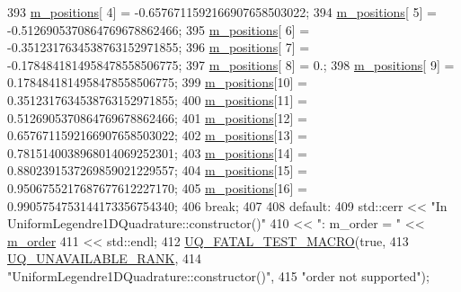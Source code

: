 \begin{DoxyCode}
393       \hyperlink{class_q_u_e_s_o_1_1_base1_d_quadrature_aeda387c028c3ba89ea0f9637a2234212}{m\_positions}[ 4] = -0.6576711592166907658503022;
394       \hyperlink{class_q_u_e_s_o_1_1_base1_d_quadrature_aeda387c028c3ba89ea0f9637a2234212}{m\_positions}[ 5] = -0.5126905370864769678862466;
395       \hyperlink{class_q_u_e_s_o_1_1_base1_d_quadrature_aeda387c028c3ba89ea0f9637a2234212}{m\_positions}[ 6] = -0.3512317634538763152971855;
396       \hyperlink{class_q_u_e_s_o_1_1_base1_d_quadrature_aeda387c028c3ba89ea0f9637a2234212}{m\_positions}[ 7] = -0.1784841814958478558506775;
397       \hyperlink{class_q_u_e_s_o_1_1_base1_d_quadrature_aeda387c028c3ba89ea0f9637a2234212}{m\_positions}[ 8] =  0.;
398       \hyperlink{class_q_u_e_s_o_1_1_base1_d_quadrature_aeda387c028c3ba89ea0f9637a2234212}{m\_positions}[ 9] =  0.1784841814958478558506775;
399       \hyperlink{class_q_u_e_s_o_1_1_base1_d_quadrature_aeda387c028c3ba89ea0f9637a2234212}{m\_positions}[10] =  0.3512317634538763152971855;
400       \hyperlink{class_q_u_e_s_o_1_1_base1_d_quadrature_aeda387c028c3ba89ea0f9637a2234212}{m\_positions}[11] =  0.5126905370864769678862466;
401       \hyperlink{class_q_u_e_s_o_1_1_base1_d_quadrature_aeda387c028c3ba89ea0f9637a2234212}{m\_positions}[12] =  0.6576711592166907658503022;
402       \hyperlink{class_q_u_e_s_o_1_1_base1_d_quadrature_aeda387c028c3ba89ea0f9637a2234212}{m\_positions}[13] =  0.7815140038968014069252301;
403       \hyperlink{class_q_u_e_s_o_1_1_base1_d_quadrature_aeda387c028c3ba89ea0f9637a2234212}{m\_positions}[14] =  0.8802391537269859021229557;
404       \hyperlink{class_q_u_e_s_o_1_1_base1_d_quadrature_aeda387c028c3ba89ea0f9637a2234212}{m\_positions}[15] =  0.9506755217687677612227170;
405       \hyperlink{class_q_u_e_s_o_1_1_base1_d_quadrature_aeda387c028c3ba89ea0f9637a2234212}{m\_positions}[16] =  0.9905754753144173356754340;
406     \textcolor{keywordflow}{break};
407 
408     \textcolor{keywordflow}{default}:
409       std::cerr << \textcolor{stringliteral}{"In UniformLegendre1DQuadrature::constructor()"}
410                 << \textcolor{stringliteral}{": m\_order = "} << \hyperlink{class_q_u_e_s_o_1_1_base1_d_quadrature_a78ba0750b7220b302e4cd1415c7d4c48}{m\_order}
411                 << std::endl;
412       \hyperlink{_defines_8h_a56d63d18d0a6d45757de47fcc06f574d}{UQ\_FATAL\_TEST\_MACRO}(\textcolor{keyword}{true},
413                           \hyperlink{namespace_q_u_e_s_o_a7d4679800a430ae8e473c1c7bc0bfb21}{UQ\_UNAVAILABLE\_RANK},
414                           \textcolor{stringliteral}{"UniformLegendre1DQuadrature::constructor()"},
415                           \textcolor{stringliteral}{"order not supported"});

\end{DoxyCode}
